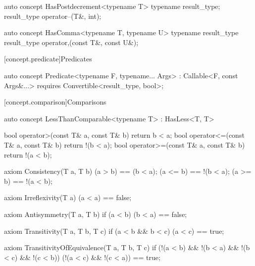 \documentclass[american,twoside]{book}
\begin{document}
\begin{itemdescr}
\pnum
{}
\end{itemdescr}

\begin{itemdecl}
auto concept HasPostdecrement<typename T> {
  typename result_type;
  result_type operator--(T&, int);
}
\end{itemdecl}

\begin{itemdescr}
\pnum
{}
\end{itemdescr}

\begin{itemdecl}
auto concept HasComma<typename T, typename U> {
  typename result_type
  result_type operator,(const T&, const U&);
}
\end{itemdecl}

\begin{itemdescr}
\pnum
{}
\end{itemdescr}

[concept.predicate]{Predicates}

\begin{itemdecl}
auto concept Predicate<typename F, typename... Args> : Callable<F, const Args&...> {
  requires Convertible<result_type, bool>;
}
\end{itemdecl}

\begin{itemdescr}
\pnum
{}

\pnum
{}
\end{itemdescr}

[concept.comparison]{Comparisons}
\begin{itemdecl}
auto concept LessThanComparable<typename T> : HasLess<T, T> {
  bool operator>(const T& a, const T& b) { return b < a; }
  bool operator<=(const T& a, const T& b) { return !(b < a); }
  bool operator>=(const T& a, const T& b) { return !(a < b); }

  axiom Consistency(T a, T b) {
    (a > b) == (b < a);
    (a <= b) == !(b < a);
    (a >= b) == !(a < b);
  }

  axiom Irreflexivity(T a) { (a < a) == false; }

  axiom Antisymmetry(T a, T b) { 
    if (a < b) 
      (b < a) == false;
  }

  axiom Transitivity(T a, T b, T c) {
    if (a < b && b < c) 
      (a < c) == true;
  }

  axiom TransitivityOfEquivalence(T a, T b, T c) {
    if (!(a < b) && !(b < a) && !(b < c) && !(c < b))
      (!(a < c) && !(c < a)) == true;
  } 
}
\end{itemdecl}
\end{document}

